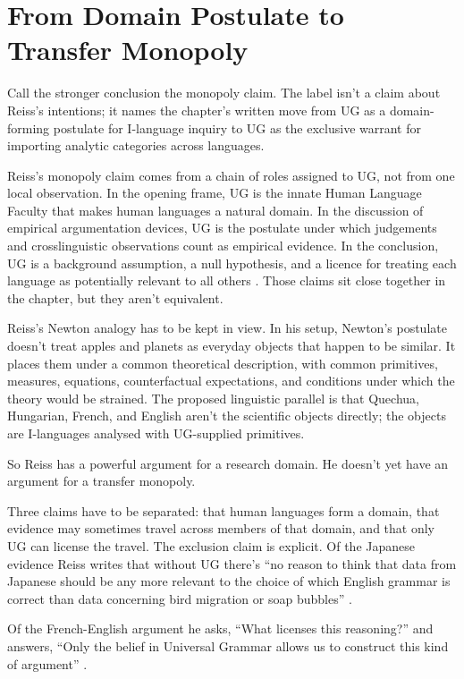 \documentclass[12pt]{article}
\begin{document}
\section{From Domain Postulate to Transfer Monopoly}

Call the stronger conclusion the monopoly claim. The label isn't a claim about Reiss's intentions; it names the chapter's written move from UG as a domain-forming postulate for I-language inquiry to UG as the exclusive warrant for importing analytic categories across languages.

Reiss's monopoly claim comes from a chain of roles assigned to UG, not from one local observation. In the opening frame, UG is the innate Human Language Faculty that makes human languages a natural domain. In the discussion of empirical argumentation devices, UG is the postulate under which judgements and crosslinguistic observations count as empirical evidence. In the conclusion, UG is a background assumption, a null hypothesis, and a licence for treating each language as potentially relevant to all others \citep[secs.~1, 5--6]{reiss2026armchair}. Those claims sit close together in the chapter, but they aren't equivalent.

Reiss's Newton analogy has to be kept in view. In his setup, Newton's postulate doesn't treat apples and planets as everyday objects that happen to be similar. It places them under a common theoretical description, with common primitives, measures, equations, counterfactual expectations, and conditions under which the theory would be strained. The proposed linguistic parallel is that Quechua, Hungarian, French, and English aren't the scientific objects directly; the objects are I-languages analysed with UG-supplied primitives.

So Reiss has a powerful argument for a research domain. He doesn't yet have an argument for a transfer monopoly.

Three claims have to be separated: that human languages form a domain, that evidence may sometimes travel across members of that domain, and that only UG can license the travel. The exclusion claim is explicit. Of the Japanese evidence Reiss writes that without UG there's \enquote{no reason to think that data from Japanese should be any more relevant to the choice of which English grammar is correct than data concerning bird migration or soap bubbles} \citep[sec.~5.3.1]{reiss2026armchair}.

Of the French-English  argument he asks, \enquote{What licenses this reasoning?} and answers, \enquote{Only the belief in Universal Grammar allows us to construct this kind of argument} \citep[sec.~5.3.3]{reiss2026armchair}.
\end{document}
